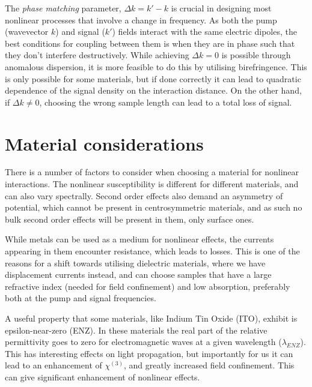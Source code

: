 \documentclass[12pt,a4paper]{article}
\begin{document}
The \emph{phase matching} parameter, $\Delta k = k'-k$ is crucial in designing most nonlinear processes that involve a change in frequency\cite{boydNonlinearOptics2008}. As both the pump (wavevector $k$) and signal ($k'$) fields interact with the same electric dipoles, the best conditions for coupling between them is when they are in phase such that they don't interfere destructively. While achieving $\Delta k=0$ is possible through anomalous dispersion, it is more feasible to do this by utilising birefringence\cite{raoNonlinearFrequencyConversion2004}. This is only possible for some materials, but if done correctly it can lead to quadratic dependence of the signal density on the interaction distance. On the other hand, if $\Delta k\neq 0$, choosing the wrong sample length can lead to a total loss of signal.

\section{Material considerations}
There is a number of factors to consider when choosing a material for nonlinear interactions. The nonlinear susceptibility is different for different materials\cite{burnsThirdHarmonicGenerationAbsorbing1971}, and can also vary spectrally\cite{carnemollaDegenerateOpticalNonlinear2018a}. Second order effects also demand an asymmetry of potential, which cannot be present in centrosymmetric materials, and as such no bulk second order effects will be present in them, only surface ones\cite{boydNonlinearOptics2008}.

While metals can be used as a medium for nonlinear effects, the currents appearing in them encounter resistance, which leads to losses. This is one of the reasons for a shift towards  utilising dielectric materials, where we have displacement currents instead\cite{krasnokAlldielectricOpticalNanoantennas2012,vandegroepDesigningDielectricResonators2013}, and can choose samples that have a large refractive index (needed for field confinement) and low absorption, preferably both at the pump and signal frequencies.

A useful property that some materials, like Indium Tin Oxide (ITO), exhibit is epsilon-near-zero (ENZ). In these materials the real part of the relative permittivity goes to zero for electromagnetic waves at a given wavelength ($\lambda_{ENZ}$). This has interesting effects on light propagation, but importantly for us it can lead to an enhancement of $\chi^{(3)}$, and greatly increased field confinement\cite{reshefNonlinearOpticalEffects2019}. This can give significant enhancement of nonlinear effects. %
\end{document}
